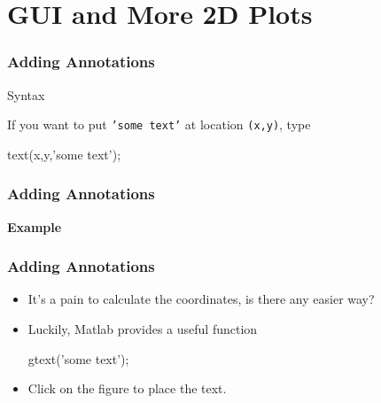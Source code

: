 \documentclass[compress]{beamer}  %
\begin{document}
\section{GUI and More 2D Plots}
\begin{frame}[fragile]
\frametitle{Adding Annotations}

\begin{block}{Syntax}

If you want to put \texttt{'some text'} at location \texttt{(x,y)}, type
\begin{matlabcodebeamer}[numbers=none,frame=none]
          text(x,y,'some text');
\end{matlabcodebeamer}
\end{block}

\end{frame}
\begin{frame}[fragile]
\frametitle{Adding Annotations}
\textbf{Example} 

\setcounter{subfigure}{0}
\begin{figure}
    \centering
\end{figure}

\end{frame}
\begin{frame}[fragile]
\frametitle{Adding Annotations}
\begin{itemize}[<+->]
    \item It's a pain to calculate the coordinates, is there any easier way?
    
    \item Luckily, Matlab provides a useful function
          \begin{matlabcode}[numbers=none,frame=none]
          gtext('some text');
          \end{matlabcode}

    \item Click on the figure to place the text.
\end{itemize}

\end{frame}
\end{document}
